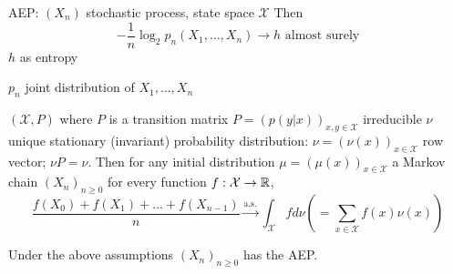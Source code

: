 \documentclass[mfit.tex]{subfiles}
\begin{document}
AEP: $(X_n)$ stochastic process, state space $\mathcal{X}$ Then
\[ - \frac{1}{n} \log_2 p_n(X_1,\dots,X_n) \to h \text{ almost surely} \]
$h$ as entropy

$p_n$ joint distribution of $X_1,\dots,X_n$

\begin{theorem}
  $(\mathcal{X},P)$ where $P$ is a transition matrix $P = (p(y|x))_{x,y \in \mathcal{X}}$ irreducible
  $\nu$ unique stationary (invariant) probability distribution: $\nu = (\nu(x))_{x \in \mathcal{X}}$ row vector; $\nu P = \nu$.
  Then for any initial distribution $\mu = (\mu(x))_{x \in \mathcal{X}}$
  a Markov chain $(X_n)_{n \geq 0}$ for every function $f: \mathcal{X} \to \mathbb{R}$,
  \[ \frac{f(X_0) + f(X_1) + \dots + f(X_{n-1})}{n} \overset{\text{a.s.}}{\to} \int_\mathcal{X} f d\nu (= \sum_{x \in \mathcal{X}} f(x) \nu(x) ) \]
\end{theorem}

\begin{theorem}
  Under the above assumptions $(X_n)_{n\geq 0}$ has the AEP.
\end{theorem}
\end{document}
